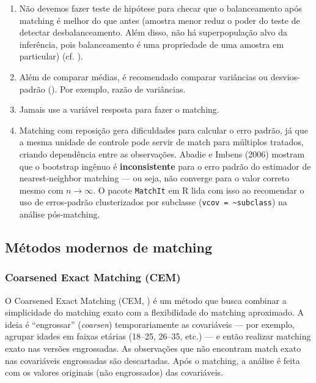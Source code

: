 \documentclass[
]{article}
\begin{document}
\begin{enumerate}
  Métodos que trabalham diretamente no espaço das covariáveis --- como CEM, Mahalanobis, ou entropy balancing --- monitoram diretamente o balanceamento em vez de delegá-lo a um escalar estimado. Note que a crítica se aplica ao propensity score como \textbf{métrica de distância para matching}, não a outros usos: IPW (ponderação), subclassificação e estimadores duplamente robustos (AIPW) continuam válidos.
\item
  Não devemos fazer teste de hipótese para checar que o balanceamento após matching é melhor do que antes (amostra menor reduz o poder do teste de detectar desbalanceamento. Além disso, não há superpopulação alvo da inferência, pois balanceamento é uma propriedade de uma amostra em particular) (cf. ).
\item
  Além de comparar médias, é recomendado comparar variâncias ou desvios-padrão (). Por exemplo, razão de variâncias.
\item
  Jamais use a variável resposta para fazer o matching.
\item
  Matching com reposição gera dificuldades para calcular o erro padrão, já que a mesma unidade de controle pode servir de match para múltiplos tratados, criando dependência entre as observações. Abadie e Imbens (2006) mostram que o bootstrap ingênuo é \textbf{inconsistente} para o erro padrão do estimador de nearest-neighbor matching --- ou seja, não converge para o valor correto mesmo com \(n \to \infty\). O pacote \texttt{MatchIt} em R lida com isso ao recomendar o uso de erros-padrão clusterizados por subclasse (\texttt{vcov\ =\ \textasciitilde{}subclass}) na análise pós-matching.
\end{enumerate}

\subsection{Métodos modernos de matching}\label{muxe9todos-modernos-de-matching}

\subsubsection{Coarsened Exact Matching (CEM)}\label{coarsened-exact-matching-cem}

O Coarsened Exact Matching (CEM, ) é um método que busca combinar a simplicidade do matching exato com a flexibilidade do matching aproximado. A ideia é ``engrossar'' (\emph{coarsen}) temporariamente as covariáveis --- por exemplo, agrupar idades em faixas etárias (18--25, 26--35, etc.) --- e então realizar matching exato nas versões engrossadas. As observações que não encontram match exato nas covariáveis engrossadas são descartadas. Após o matching, a análise é feita com os valores originais (não engrossados) das covariáveis.
\end{document}
